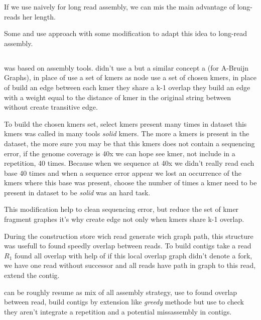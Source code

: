 \documentclass[main]{subfiles}
\begin{document}
If we use \DBG naively for long read assembly, we can mis the main advantage of long-reads her length.

Some \flye and \wtdbg use \DBG approach with some modification to adapt this idea to long-read assembly.

\subsection{\flye}

\flye\cite{Flye} was based on \abruijn\cite{abruijn} assembly tools. \abruijn didn't use a \DBG but a similar concept a  (for A-Bruijn Graphs), in place of use a set of kmers as node  use a set of chosen kmers, in place of build an edge between each kmer they share a k-1 overlap they build an edge with a weight equal to the distance of kmer in the original string between without create transitive edge.

To build the chosen kmers set, \abruijn select kmers present many times in dataset this kmers was called in many tools \textit{solid} kmers. The more a kmers is present in the dataset, the more sure you may be that this kmers does not contain a sequencing error, if the genome coverage is 40x we can hope see kmer, not include in a repetition, 40 times. Because when we sequence at 40x we didn't really read each base 40 times and when a sequence error appear we lost an occurrence of the kmers where this base was present, choose the number of times a kmer need to be present in dataset to be \textit{solid} was an hard task.

This modification help to clean sequencing error, but reduce the set of kmer fragment \DBG graphes it's why  create edge not only when kmers share k-1 overlap. 

During the  construction \abruijn store wich read generate wich graph path, this structure was usefull to found speedly overlap between reads. To build contigs \abruijn take a read $R_1$ found all overlap with help of  if this local overlap graph didn't denote a fork, we have one read without successor and all reads have path in graph to this read, \abruijn extend the contig.

\abruijn can be roughly resume as mix of all assembly strategy, use \DBG to found overlap between read, build contigs by extension like \textit{greedy} methode but use \OLC to check they aren't integrate a repetition and a potential missassembly in contigs.
\end{document}
